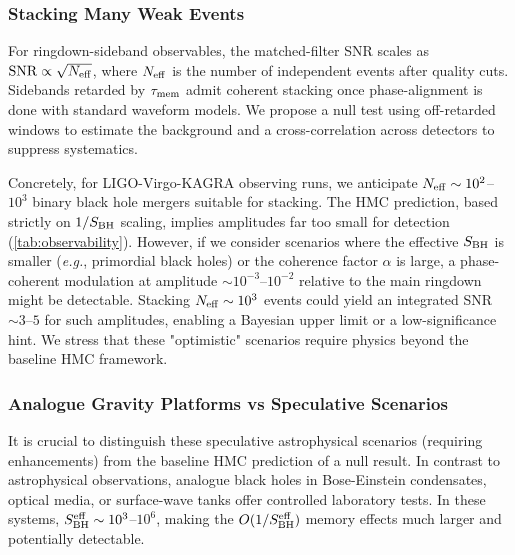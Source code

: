 \documentclass[aps,prd,preprint,onecolumn,superscriptaddress,nofootinbib,longbibliography,floatfix,11pt,showpacs,showkeys]{revtex4-2}
\newcommand{\eg}{\textit{e.g.}\xspace}
\newcommand{\HMC}{\textsc{HMC}\xspace}
\theoremstyle{plain}
\theoremstyle{definition}
\theoremstyle{remark}
\begin{document}
\subsubsection{Stacking Many Weak Events}
For ringdown-sideband observables, the matched-filter SNR scales as ${\rm SNR}\propto \sqrt{N_{\rm eff}}$, where $N_{\rm eff}$ is the number of independent events after quality cuts. Sidebands retarded by $\tau_{\rm mem}$ admit coherent stacking once phase-alignment is done with standard waveform models. We propose a null test using off-retarded windows to estimate the background and a cross-correlation across detectors to suppress systematics.

Concretely, for LIGO-Virgo-KAGRA observing runs, we anticipate $N_{\rm eff} \sim 10^2$--$10^3$ binary black hole mergers suitable for stacking. The \HMC{} prediction, based strictly on $1/S_{\rm BH}$ scaling, implies amplitudes far too small for detection (\cref{tab:observability}). However, if we consider scenarios where the effective $S_{\rm BH}$ is smaller (\eg, primordial black holes) or the coherence factor $\alpha$ is large, a phase-coherent modulation at amplitude $\sim 10^{-3}$--$10^{-2}$ relative to the main ringdown might be detectable. Stacking $N_{\rm eff} \sim 10^3$ events could yield an integrated SNR $\sim 3$--$5$ for such amplitudes, enabling a Bayesian upper limit or a low-significance hint.
We stress that these "optimistic" scenarios require physics beyond the baseline \HMC{} framework.

\subsubsection{Analogue Gravity Platforms vs Speculative Scenarios}
It is crucial to distinguish these speculative astrophysical scenarios (requiring enhancements) from the baseline \HMC{} prediction of a null result.
In contrast to astrophysical observations, analogue black holes in Bose-Einstein condensates, optical media, or surface-wave tanks offer controlled laboratory tests. In these systems, $S_{\rm BH}^{\rm eff} \sim 10^3$--$10^6$, making the $O(1/S_{\rm BH}^{\rm eff})$ memory effects much larger and potentially detectable.
\end{document}
